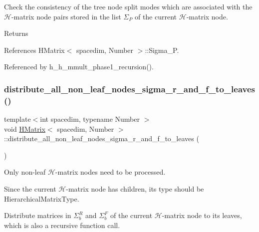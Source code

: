 Check the consistency of the tree node split modes which are associated with the $\mathcal{H}$-\/matrix node pairs stored in the list $\Sigma_P$ of the current $\mathcal{H}$-\/matrix node. \begin{DoxyReturn}{Returns}

\end{DoxyReturn}


References H\+Matrix$<$ spacedim, Number $>$\+::\+Sigma\+\_\+P.



Referenced by h\+\_\+h\+\_\+mmult\+\_\+phase1\+\_\+recursion().

\mbox{\label{classHMatrix_a01360c3d9a93154f2e629b6c413aa991}} 
\subsubsection{\texorpdfstring{distribute\+\_\+all\+\_\+non\+\_\+leaf\+\_\+nodes\+\_\+sigma\+\_\+r\+\_\+and\+\_\+f\+\_\+to\+\_\+leaves()}{distribute\_all\_non\_leaf\_nodes\_sigma\_r\_and\_f\_to\_leaves()}}
{\footnotesize\ttfamily template$<$int spacedim, typename Number $>$ \\
void \hyperlink{classHMatrix}{H\+Matrix}$<$ spacedim, Number $>$\+::distribute\+\_\+all\+\_\+non\+\_\+leaf\+\_\+nodes\+\_\+sigma\+\_\+r\+\_\+and\+\_\+f\+\_\+to\+\_\+leaves (\begin{DoxyParamCaption}{ }\end{DoxyParamCaption})\hspace{0.3cm}{\ttfamily [private]}}

Only non-\/leaf $\mathcal{H}$-\/matrix nodes need to be processed.

Since the current $\mathcal{H}$-\/matrix node has children, its type should be {\ttfamily Hierarchical\+Matrix\+Type}.

Distribute matrices in $\Sigma_b^R$ and $\Sigma_b^F$ of the current $\mathcal{H}$-\/matrix node to its leaves, which is also a recursive function call.

